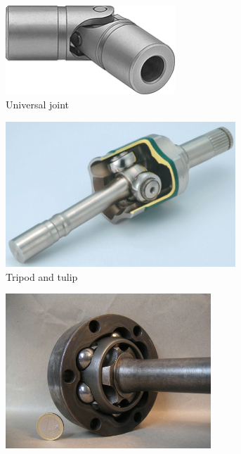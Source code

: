 \begin{figure}[H]
		\begin{subfigure}[b]{.24\linewidth}
			\includegraphics[width=0.7\textwidth]{imgs/coupling_ujoint.png}
			\caption{Universal joint}
		\end{subfigure}
		\begin{subfigure}[b]{.24\linewidth}
			\includegraphics[width=0.95\textwidth]{imgs/coupling_tripod.png}
			\caption{Tripod and tulip}
		\end{subfigure}
		\begin{subfigure}[b]{.24\linewidth}
			\includegraphics[width=0.85\textwidth]{imgs/coupling_rzeppa.jpeg}

\end{subfigure}
\end{figure}
